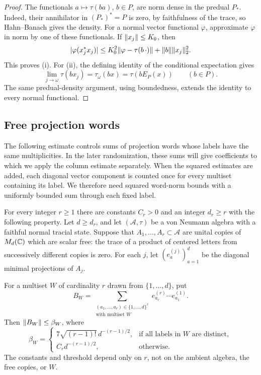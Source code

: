 \begin{proof}
The functionals \(a\mapsto\tau(ba)\), \(b\in P\), are norm dense in
the predual \(P_*\). Indeed, their annihilator in
\((P_*)^*=P\) is zero, by faithfulness of the trace, so
Hahn--Banach gives the density.
For a normal vector functional \(\varphi\), approximate \(\varphi\)
in norm by one of these functionals. If \(\lVert x_j\rVert\le K_0\), then
\[
 |\varphi(x_j^*x_j)|
 \le K_0^2\lVert\varphi-\tau(b\,\cdot)\rVert
       +\lVert b\rVert\lVert x_j\rVert_2^2.
\]
This proves (i). For (ii), the defining identity of the conditional
expectation gives
\[
 \lim_{j\to\omega}\tau(bx_j)
 =\tau_\omega(bx)=\tau(bE_P(x))\qquad(b\in P).
\]
The same predual-density argument, using boundedness, extends the
identity to every normal functional.
\end{proof}

\subsection{Free projection words}

The following estimate controls sums of projection words whose labels have
the same multiplicities. In the later randomization, these sums will give
coefficients to which we apply the column estimate separately. When the
squared estimates are added, each diagonal vector component is counted
once for every multiset containing its label. We therefore need squared
word-norm bounds with a uniformly bounded sum through each fixed label.

\begin{lemma}\label{lem:free-words}
For every integer $r\geq 1$ there are constants $C_r>0$ and an integer
$d_r\geq r$ with the following property.  Let $d\geq d_r$, and let
$(\mathcal A,\tau)$ be a von Neumann algebra with a faithful normal
tracial state.  Suppose that $A_1,\ldots,A_r\subset\mathcal A$ are
unital copies of $M_d(\mathbb C)$ which are scalar free: the trace of a product
of centered letters from successively different copies is zero.
For each $j$, let $(e_a^{(j)})_{a=1}^d$ be the diagonal minimal
projections of $A_j$.

For a multiset $W$ of cardinality $r$ drawn from $\{1,\ldots,d\}$, put
\[
 B_W=\sum_{\substack{(a_1,\ldots,a_r)\in\{1,\ldots,d\}^r\\
                     \text{with multiset }W}}
       e_{a_r}^{(r)}\cdots e_{a_1}^{(1)}.
\]
Then $\lVert B_W\rVert\leq\beta_W$, where
\begin{equation}\label{eq:fw-beta}
 \beta_W=
 \begin{cases}
  7\sqrt{(r-1)!}\,d^{-(r-1)/2},
       &\text{if all labels in $W$ are distinct},\\
  C_r d^{-(r-1)/2},&\text{otherwise}.
 \end{cases}
\end{equation}
The constants and threshold depend only on $r$, not on the ambient
algebra, the free copies, or $W$.
\end{lemma}

